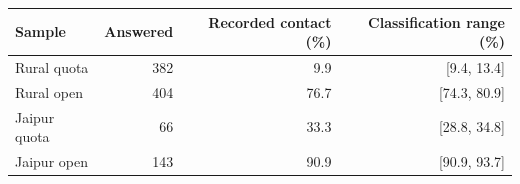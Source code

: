 
\begin{tabular}[t]{lrrr}
\toprule
Sample & Answered & Recorded contact (\%) & Classification range (\%)\\
\midrule
Rural quota & 382 & 9.9 & {}[9.4, 13.4]\\
Rural open & 404 & 76.7 & {}[74.3, 80.9]\\
Jaipur quota & 66 & 33.3 & {}[28.8, 34.8]\\
Jaipur open & 143 & 90.9 & {}[90.9, 93.7]\\
\bottomrule
\end{tabular}
